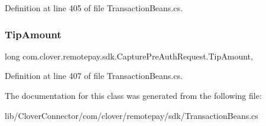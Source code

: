 Definition at line 405 of file Transaction\+Beans.\+cs.

\mbox{\label{classcom_1_1clover_1_1remotepay_1_1sdk_1_1_capture_pre_auth_request_a5a34025a2bb189f2458ea17796565fe7}} 
\subsubsection{\texorpdfstring{Tip\+Amount}{TipAmount}}
{\footnotesize\ttfamily long com.\+clover.\+remotepay.\+sdk.\+Capture\+Pre\+Auth\+Request.\+Tip\+Amount\hspace{0.3cm}{\ttfamily [get]}, {\ttfamily [set]}}



Definition at line 407 of file Transaction\+Beans.\+cs.



The documentation for this class was generated from the following file\+:\begin{DoxyCompactItemize}
\item 
lib/\+Clover\+Connector/com/clover/remotepay/sdk/Transaction\+Beans.\+cs\end{DoxyCompactItemize}
